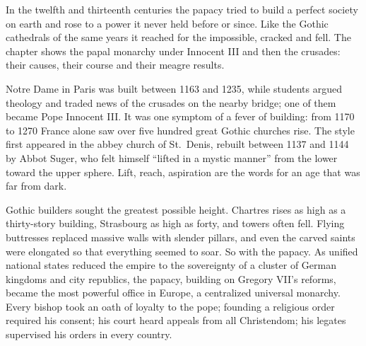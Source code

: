 
\begin{inbrief}
In the twelfth and thirteenth centuries the papacy tried to build a perfect society on earth and rose
to a power it never held before or since. Like the Gothic cathedrals of the same years it reached for
the impossible, cracked and fell. The chapter shows the papal monarchy under Innocent III and then the
crusades: their causes, their course and their meagre results.
\end{inbrief}

Notre Dame in Paris was built between 1163 and 1235, while students argued theology and traded news of
the crusades on the nearby bridge; one of them became Pope Innocent III. It was one symptom of a fever
of building: from 1170 to 1270 France alone saw over five hundred great Gothic churches rise.
The style first appeared in the abbey church of St.~Denis, rebuilt between 1137 and 1144 by Abbot
Suger, who felt himself ``lifted in a mystic manner'' from the lower toward the upper sphere. Lift,
reach, aspiration are the words for an age that was far from dark.

Gothic builders sought the greatest possible height. Chartres rises as high as a thirty-story
building, Strasbourg as high as forty, and towers often fell. Flying buttresses replaced massive walls
with slender pillars, and even the carved saints were elongated so that everything seemed to soar. So
with the papacy. As unified national states reduced the empire to the sovereignty of a cluster of
German kingdoms and city republics, the papacy, building on Gregory VII's reforms, became the most
powerful office in Europe, a centralized universal monarchy. Every bishop took an oath of loyalty to the pope; founding a religious order required his consent; his court heard appeals from all Christendom; his
legates supervised his orders in every country.

